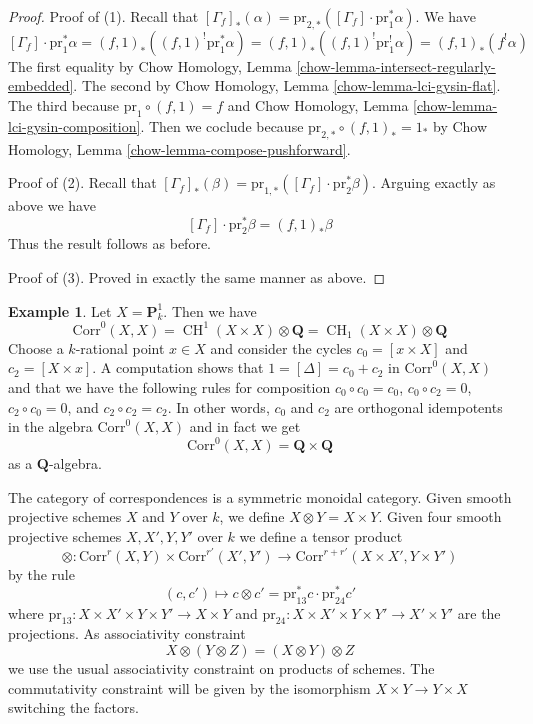 \documentclass{stacks-project}
\theoremstyle{plain}
\theoremstyle{definition}
\newtheorem{example}[subsection]{Example}
\theoremstyle{remark}
\numberwithin{equation}{subsection}
\def\CH{\mathop{\mathrm{CH}}\nolimits}
\begin{document}
\begin{proof}
Proof of (1). Recall that
$[\Gamma_f]_*(\alpha) =
\text{pr}_{2, *}([\Gamma_f] \cdot \text{pr}_1^*\alpha)$.
We have
$$
[\Gamma_f] \cdot \text{pr}_1^*\alpha =
(f, 1)_*((f, 1)^! \text{pr}_1^*\alpha) =
(f, 1)_*((f, 1)^! \text{pr}_1^!\alpha) =
(f, 1)_*(f^!\alpha)
$$
The first equality by Chow Homology, Lemma
\ref{chow-lemma-intersect-regularly-embedded}.
The second by 
Chow Homology, Lemma \ref{chow-lemma-lci-gysin-flat}.
The third because $\text{pr}_1 \circ (f, 1) = f$ and
Chow Homology, Lemma \ref{chow-lemma-lci-gysin-composition}.
Then we coclude because
$\text{pr}_{2, *} \circ (f, 1)_* = 1_*$ by
Chow Homology, Lemma \ref{chow-lemma-compose-pushforward}.

\medskip\noindent
Proof of (2). Recall that $[\Gamma_f]_*(\beta) =
\text{pr}_{1, *}([\Gamma_f] \cdot \text{pr}_2^*\beta)$.
Arguing exactly as above we have
$$
[\Gamma_f] \cdot \text{pr}_2^*\beta = (f, 1)_*\beta
$$
Thus the result follows as before.

\medskip\noindent
Proof of (3). Proved in exactly the same manner as above.
\end{proof}

\begin{example}
\label{example-decompose-P1}
Let $X = \mathbf{P}^1_k$. Then we have
$$
\text{Corr}^0(X, X) = \CH^1(X \times X) \otimes \mathbf{Q} =
\CH_1(X \times X) \otimes \mathbf{Q}
$$
Choose a $k$-rational point $x \in X$ and
consider the cycles $c_0 = [x \times X]$ and $c_2 = [X \times x]$.
A computation shows that $1 = [\Delta] = c_0 + c_2$ in $\text{Corr}^0(X, X)$
and that we have the following rules for composition
$c_0 \circ c_0 = c_0$,
$c_0 \circ c_2 = 0$,
$c_2 \circ c_0 = 0$, and
$c_2 \circ c_2 = c_2$.
In other words, $c_0$ and $c_2$ are orthogonal idempotents in
the algebra $\text{Corr}^0(X, X)$ and in fact we get
$$
\text{Corr}^0(X, X) = \mathbf{Q} \times \mathbf{Q}
$$
as a $\mathbf{Q}$-algebra.
\end{example}

\noindent
The category of correspondences is a symmetric monoidal category.
Given smooth projective schemes $X$ and $Y$ over $k$, we define
$X \otimes Y = X \times Y$. Given four smooth projective schemes
$X, X', Y, Y'$ over $k$ we define a tensor product
$$
\otimes :
\text{Corr}^r(X, Y) \times \text{Corr}^{r'}(X', Y')
\longrightarrow
\text{Corr}^{r + r'}(X \times X', Y \times Y')
$$
by the rule
$$
(c, c') \longmapsto
c \otimes c' = \text{pr}_{13}^*c \cdot \text{pr}_{24}^*c'
$$
where $\text{pr}_{13} : X \times X' \times Y \times Y' \to X \times Y$
and $\text{pr}_{24} : X \times X' \times Y \times Y' \to X' \times Y'$
are the projections. As associativity constraint
$$
X \otimes (Y \otimes Z) = (X \otimes Y) \otimes Z
$$
we use the usual associativity constraint on products of schemes.
The commutativity constraint will be given by the isomorphism
$X \times Y \to Y \times X$ switching the factors.
\end{document}
